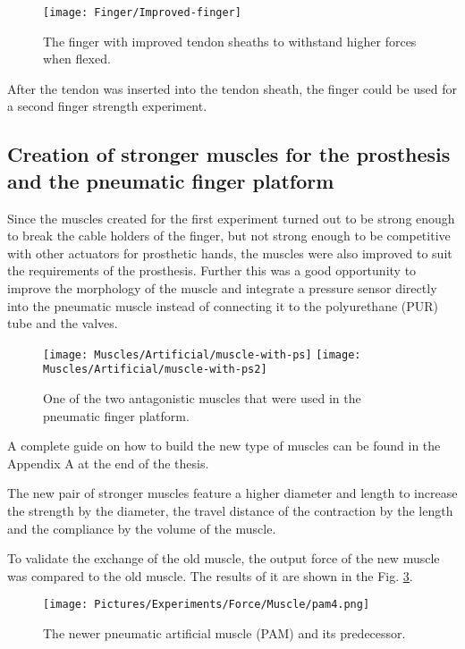 \documentclass[main]{subfiles}
\begin{document}
\begin{figure}[htp]
\centering
\texttt{[image: Finger/Improved-finger]}
\caption[The Blue finger]{The finger with improved tendon sheaths to withstand higher forces when flexed.}
\label{blue-finger}
\end{figure}

After the tendon was inserted into the tendon sheath, the finger could be used for a second finger strength experiment.

\subsection{Creation of stronger muscles for the prosthesis and the pneumatic finger platform}

Since the muscles created for the first experiment turned out to be strong enough to break the cable holders of the finger, but not strong enough to be competitive with other actuators for prosthetic hands, the muscles were also improved to suit the requirements of the prosthesis. Further this was a good opportunity to improve the morphology of the muscle and integrate a pressure sensor directly into the pneumatic muscle instead of connecting it to the polyurethane (PUR) tube and the valves.

\begin{figure}[htp]
\centering
\texttt{[image: Muscles/Artificial/muscle-with-ps]}
\texttt{[image: Muscles/Artificial/muscle-with-ps2]}
\caption[Pneumatic artificial muscle]{One of the two antagonistic muscles that were used in the pneumatic finger platform.}
\label{improved-muscle}
\end{figure}

A complete guide on how to build the new type of muscles can be found in the Appendix A at the end of the thesis.

The new pair of stronger muscles feature a higher diameter and length to increase the strength by the diameter, the travel distance of the contraction by the length and the compliance by the volume of the muscle. 

To validate the exchange of the old muscle, the output force of the new muscle was compared to the old muscle. The results of it are shown in the Fig. \ref{muscle-force}.

\begin{figure}[htp]
\centering
\texttt{[image: Pictures/Experiments/Force/Muscle/pam4.png]}
\caption[Muscle force comparison]{The newer pneumatic artificial muscle (PAM) and its predecessor.}
\label{muscle-force}
\end{figure}
\end{document}
